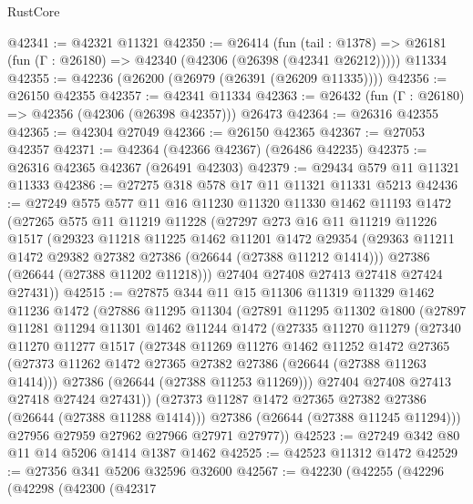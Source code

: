 \begin{lexlean}{RustCore}
\begin{coremodule}
@42341 := @42321 @11321
@42350 := @26414
    (fun (tail : @1378) => @26181 (fun (Γ : @26180) => @42340 (@42306 (@26398 (@42341 @26212)))))
    @11334
@42355 := @42236 (@26200 (@26979 (@26391 (@26209 @11335))))
@42356 := @26150 @42355
@42357 := @42341 @11334
@42363 := @26432 (fun (Γ : @26180) => @42356 (@42306 (@26398 @42357))) @26473
@42364 := @26316 @42355
@42365 := @42304 @27049
@42366 := @26150 @42365
@42367 := @27053 @42357
@42371 := @42364 (@42366 @42367) (@26486 @42235)
@42375 := @26316 @42365 @42367 (@26491 @42303)
@42379 := @29434 @579 @11 @11321 @11333
@42386 := @27275 @318 @578 @17 @11 @11321 @11331 @5213
@42436 := @27249
    @575
    @577
    @11
    @16
    @11230
    @11320
    @11330
    @1462
    @11193
    @1472
    (@27265
      @575
      @11
      @11219
      @11228
      (@27297
        @273
        @16
        @11
        @11219
        @11226
        @1517
        (@29323
          @11218
          @11225
          @1462
          @11201
          @1472
          @29354
          (@29363 @11211 @1472 @29382 @27382 @27386 (@26644 (@27388 @11212 @1414)))
          @27386
          (@26644 (@27388 @11202 @11218)))
        @27404
        @27408
        @27413
        @27418
        @27424
        @27431))
@42515 := @27875
    @344
    @11
    @15
    @11306
    @11319
    @11329
    @1462
    @11236
    @1472
    (@27886
      @11295
      @11304
      (@27891
        @11295
        @11302
        @1800
        (@27897
          @11281
          @11294
          @11301
          @1462
          @11244
          @1472
          (@27335
            @11270
            @11279
            (@27340
              @11270
              @11277
              @1517
              (@27348
                @11269
                @11276
                @1462
                @11252
                @1472
                @27365
                (@27373 @11262 @1472 @27365 @27382 @27386 (@26644 (@27388 @11263 @1414)))
                @27386
                (@26644 (@27388 @11253 @11269)))
              @27404
              @27408
              @27413
              @27418
              @27424
              @27431))
          (@27373 @11287 @1472 @27365 @27382 @27386 (@26644 (@27388 @11288 @1414)))
          @27386
          (@26644 (@27388 @11245 @11294)))
        @27956
        @27959
        @27962
        @27966
        @27971
        @27977))
@42523 := @27249 @342 @80 @11 @14 @5206 @1414 @1387 @1462
@42525 := @42523 @11312 @1472
@42529 := @27356 @341 @5206 @32596 @32600
@42567 := @42230
    (@42255
      (@42296
        (@42298
          (@42300
            (@42317

\end{coremodule}
\end{lexlean}
